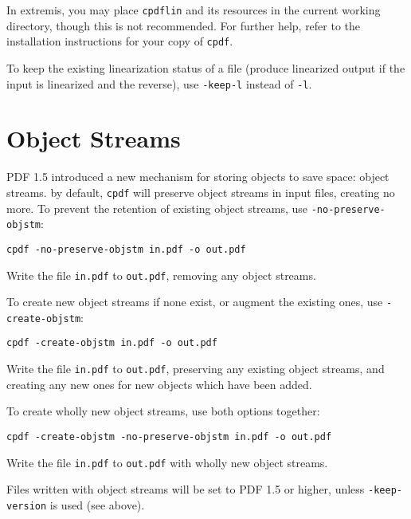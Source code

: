 \documentclass{book}
\begin{document}
In extremis, you may place \texttt{cpdflin} and its resources in the current working directory, though this is not recommended. For further help, refer to the installation instructions for your copy of \texttt{cpdf}.

To keep the existing linearization status of a file (produce linearized output if the input is linearized and the reverse), use \texttt{-keep-l} instead of \texttt{-l}.

\section{Object Streams}
PDF 1.5 introduced a new mechanism for storing objects to save space: object streams. by default, \texttt{cpdf} will preserve object streams in input files, creating no more. To prevent the retention of existing object streams, use \texttt{-no-preserve-objstm}:

\begin{framed}
\small\verb!cpdf -no-preserve-objstm in.pdf -o out.pdf!

\vspace{2.5mm}
\noindent Write the file \texttt{in.pdf} to \texttt{out.pdf}, removing any object streams.
\end{framed}

\noindent To create new object streams if none exist, or augment the existing ones, use \texttt{-create-objstm}:

\begin{framed}
\small\verb!cpdf -create-objstm in.pdf -o out.pdf!

\vspace{2.5mm}
\noindent Write the file \texttt{in.pdf} to \texttt{out.pdf}, preserving any existing object streams, and creating any new ones for new objects which have been added.
\end{framed}

\noindent To create wholly new object streams, use both options together:

\begin{framed}
\small\verb!cpdf -create-objstm -no-preserve-objstm in.pdf -o out.pdf!

\vspace{2.5mm}
\noindent Write the file \texttt{in.pdf} to \texttt{out.pdf} with wholly new object streams.
\end{framed}

\noindent Files written with object streams will be set to PDF 1.5 or higher, unless \texttt{-keep-version} is used (see above).
\end{document}
